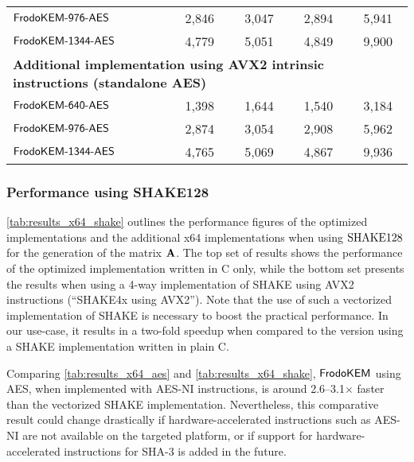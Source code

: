 \begin{table}[t]
\begin{tabular}{l|c c c|c}
$\textsf{\upshape\mdseries FrodoKEM-976-AES}$                             &            2,846                &            3,047                   &                2,894       &                5,941             \\
$\textsf{\upshape\mdseries FrodoKEM-1344-AES}$                             &            4,779                &            5,051                   &                 4,849       &                 9,900             \\
\midrule
\multicolumn{5}{l}{\bf Additional implementation using AVX2 intrinsic instructions (standalone AES)} \\
\midrule
$\textsf{\upshape\mdseries FrodoKEM-640-AES}$                               &            1,398                &            1,644                   &                 1,540       &                3,184             \\
$\textsf{\upshape\mdseries FrodoKEM-976-AES}$                             &            2,874                &            3,054                   &                 2,908       &                5,962             \\
$\textsf{\upshape\mdseries FrodoKEM-1344-AES}$                             &            4,765                &            5,069                   &                 4,867       &                9,936             \\
\bottomrule
\end{tabular}
\end{table}


\subsubsection{Performance using SHAKE128}\label{sec:results_shake}

\autoref{tab:results_x64_shake} outlines the performance figures of the optimized implementations and the additional x64 implementations when using $\textrm{\upshape\mdseries SHAKE}128$ for the generation of the matrix $\mathbf{A}$. 
The top set of results shows the performance of the optimized implementation written in C only, while the bottom set presents the results when using a 4-way implementation of SHAKE using AVX2 instructions (``SHAKE4x using AVX2'').
Note that the use of such a vectorized implementation of SHAKE is necessary to boost the practical performance. In our use-case, it results in a two-fold speedup when compared to the version using a SHAKE implementation written in plain C.

Comparing \autoref{tab:results_x64_aes} and \autoref{tab:results_x64_shake}, $\textsf{\upshape\mdseries FrodoKEM}$ using AES, when implemented with AES-NI instructions, is around 2.6--3.1$\times$ faster than the vectorized SHAKE implementation. Nevertheless, this comparative result could change drastically if hardware-accelerated instructions such as AES-NI are not available on the targeted platform, or if support for hardware-accelerated instructions for SHA-3 is added in the future. 


